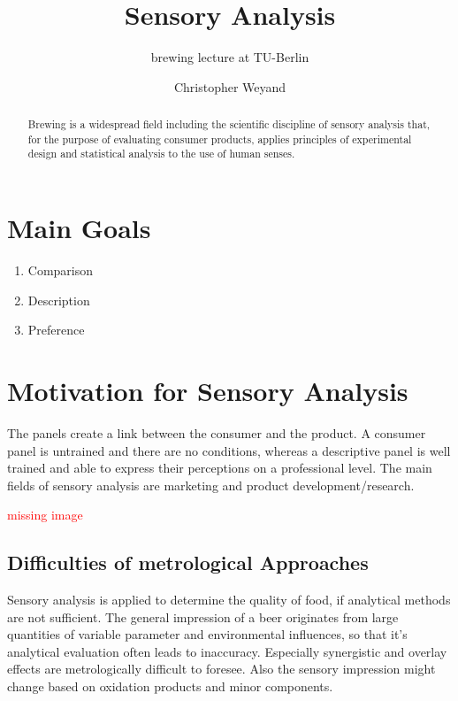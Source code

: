 \documentclass[]{scrartcl}
\begin{document}
\title{Sensory Analysis}
\subtitle{brewing lecture at TU-Berlin}
\author{Christopher Weyand}
\maketitle
\begin{abstract}
Brewing is a widespread field including the scientific discipline of sensory analysis
that, for the purpose of evaluating consumer products, applies principles of experimental
design and statistical analysis to the use of human senses.
\end{abstract}
\newpage

\tableofcontents
\newpage

\listoffigures
\newpage


\section{Main Goals}
\begin{enumerate}
  \item Comparison
  \item Description
  \item Preference
\end{enumerate}

\section{Motivation for Sensory Analysis}
The panels create a link between the consumer and the product.
A consumer panel is untrained and there are no conditions, whereas a
descriptive panel is well trained and able to express their perceptions
on a professional level. The main fields of sensory analysis
are marketing and product development/research.

\textcolor{red}{missing image}

\subsection{Difficulties of metrological Approaches}
Sensory analysis is applied to determine the quality of food, if analytical
methods are not sufficient. The general impression of a beer originates from
large quantities of variable parameter and environmental influences,
so that it's analytical evaluation often leads to inaccuracy.
Especially synergistic and overlay effects are metrologically difficult to foresee.
Also the sensory impression might change based on oxidation products and
minor components.
\end{document}
